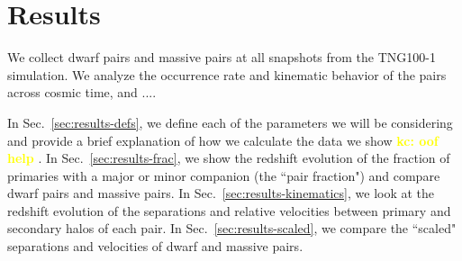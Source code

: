 \documentclass[twocolumn]{aastex631}
\newcommand{\kc}[1]{\textcolor{yellow}{\textbf{kc: #1}} }
\begin{document}

\section{Results}
We collect dwarf pairs and massive pairs at all snapshots from the TNG100-1 simulation. 
We analyze the occurrence rate and kinematic behavior of the pairs across cosmic time, and .... 

In Sec.~\ref{sec:results-defs}, we define each of the parameters we will be considering and provide a brief explanation of how we calculate the data we show \kc{oof help}.
In Sec.~\ref{sec:results-frac}, we show the redshift evolution of the fraction of primaries with a major or minor companion (the ``pair fraction") and compare dwarf pairs and massive pairs.
In Sec.~\ref{sec:results-kinematics}, we look at the redshift evolution of the separations and relative velocities between primary and secondary halos of each pair. %
In Sec.~\ref{sec:results-scaled}, we compare the ``scaled" separations and velocities of dwarf and massive pairs.
\end{document}
